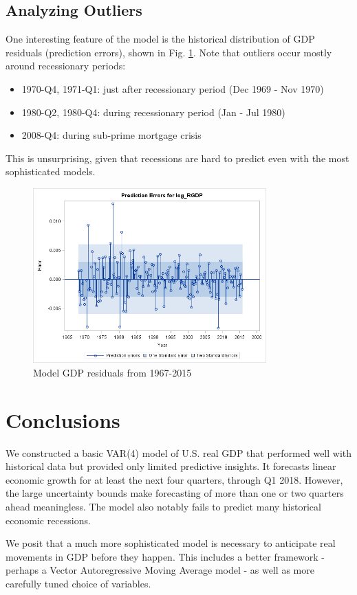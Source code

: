 \subsection{Analyzing Outliers}

    One interesting feature of the model is the historical distribution of GDP residuals
    (prediction errors), shown in Fig. \ref{fig:residuals}.  Note that outliers 
    occur mostly around recessionary periods:
    \begin{itemize}
        \item 1970-Q4, 1971-Q1: just after recessionary period (Dec 1969 - Nov 1970)
        \item 1980-Q2, 1980-Q4: during recessionary period (Jan - Jul 1980)
        \item 2008-Q4: during sub-prime mortgage crisis
    \end{itemize}
    
    This is unsurprising, given that recessions are hard to predict even with
    the most sophisticated models.
    
    \begin{figure}[!h]
        \begin{center}
        \includegraphics[width=0.8\textwidth]{../img/model1-residuals.png}
        \end{center}
        \caption{Model GDP residuals from 1967-2015}
        \label{fig:residuals}
    \end{figure}
    

\section{Conclusions}
   
    We constructed a basic VAR(4) model of U.S. real GDP that performed well with
    historical data but provided only limited predictive insights.  It forecasts
    linear economic growth for at least the next four quarters, through Q1 2018.
    However, the large uncertainty bounds make forecasting of more than one
    or two quarters ahead meaningless.  The model also notably
    fails to predict many historical economic recessions.
    
    We posit that a much more sophisticated model is necessary to anticipate
    real movements in GDP before they happen.  This includes a better framework -
    perhaps a Vector Autoregressive Moving Average model - as well as more 
    carefully tuned choice of variables.